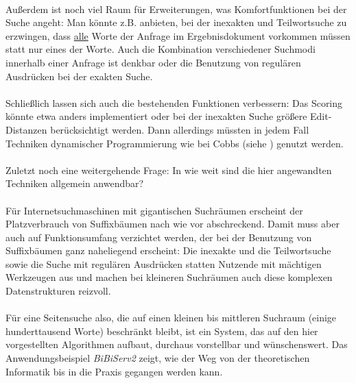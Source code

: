 \paragraph{} Außerdem ist noch viel Raum für Erweiterungen, was Komfortfunktionen bei der Suche angeht: Man könnte z.B. anbieten, bei der inexakten und Teilwortsuche zu erzwingen, dass \underline{alle} Worte der Anfrage im Ergebnisdokument vorkommen müssen statt nur eines der Worte. Auch die Kombination verschiedener Suchmodi innerhalb einer Anfrage ist denkbar oder die Benutzung von regulären Ausdrücken bei der exakten Suche.
\paragraph{} Schließlich lassen sich auch die bestehenden Funktionen verbessern: Das Scoring könnte etwa anders implementiert oder bei der inexakten Suche größere Edit-Distanzen berücksichtigt werden. Dann allerdings müssten in jedem Fall Techniken dynamischer Programmierung wie bei Cobbs (siehe \cite{approxTreesCobbs}) genutzt werden.

\paragraph{} Zuletzt noch eine weitergehende Frage: In wie weit sind die hier angewandten Techniken allgemein anwendbar?
\paragraph{} Für Internetsuchmaschinen mit gigantischen Suchräumen erscheint der Platzverbrauch von Suffixbäumen nach wie vor abschreckend. Damit muss aber auch auf Funktionsumfang verzichtet werden, der bei der Benutzung von Suffixbäumen ganz naheliegend erscheint: Die inexakte und die Teilwortsuche sowie die Suche mit regulären Ausdrücken statten Nutzende mit mächtigen Werkzeugen aus und machen bei kleineren Suchräumen auch diese komplexen Datenstrukturen reizvoll.
\paragraph{} Für eine Seitensuche also, die auf einen kleinen bis mittleren Suchraum (einige hunderttausend Worte) beschränkt bleibt, ist ein System, das auf den hier vorgestellten Algorithmen aufbaut, durchaus vorstellbar und wünschenswert. Das Anwendungsbeispiel \textit{BiBiServ2} zeigt, wie der Weg von der theoretischen Informatik bis in die Praxis gegangen werden kann.

